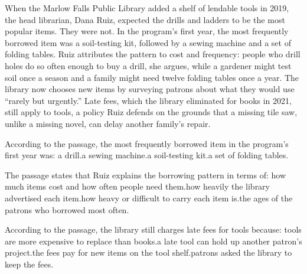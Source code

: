 \documentclass[11pt]{article}
\begin{document}
\begin{passage}
When the Marlow Falls Public Library added a shelf of lendable tools in 2019, the head librarian, Dana Ruiz, expected the drills and ladders to be the most popular items. They were not. In the program's first year, the most frequently borrowed item was a soil-testing kit, followed by a sewing machine and a set of folding tables. Ruiz attributes the pattern to cost and frequency: people who drill holes do so often enough to buy a drill, she argues, while a gardener might test soil once a season and a family might need twelve folding tables once a year. The library now chooses new items by surveying patrons about what they would use ``rarely but urgently.'' Late fees, which the library eliminated for books in 2021, still apply to tools, a policy Ruiz defends on the grounds that a missing tile saw, unlike a missing novel, can delay another family's repair.
\end{passage}

{According to the passage, the most frequently borrowed item in the program's first year was:}
{a drill.}{a sewing machine.}{a soil-testing kit.}{a set of folding tables.}

{The passage states that Ruiz explains the borrowing pattern in terms of:}
{how much items cost and how often people need them.}{how heavily the library advertised each item.}{how heavy or difficult to carry each item is.}{the ages of the patrons who borrowed most often.}

{According to the passage, the library still charges late fees for tools because:}
{tools are more expensive to replace than books.}{a late tool can hold up another patron's project.}{the fees pay for new items on the tool shelf.}{patrons asked the library to keep the fees.}

\end{document}
